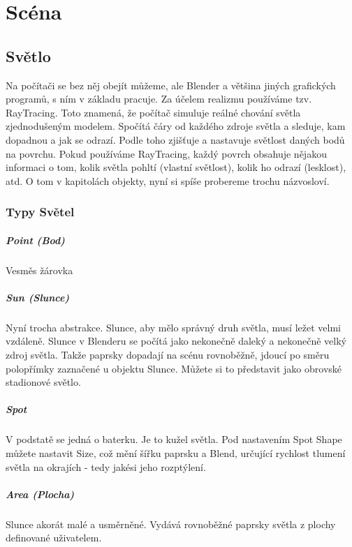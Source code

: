 \documentclass[12pt,a4paper]{report}
\begin{document}
	\chapter{Scéna}
	\section{Světlo}
	Na počítači se bez něj obejít můžeme, ale Blender a většina jiných
	grafických programů, s ním v základu pracuje. Za účelem realizmu
	používáme tzv. RayTracing. Toto znamená, že počítač simuluje reálné
	chování světla zjednodušeným modelem. Spočítá čáry od každého zdroje
	světla a sleduje, kam dopadnou a jak se odrazí. Podle toho zjišťuje
	a nastavuje světlost daných bodů na povrchu. Pokud používáme
	RayTracing, každý povrch obsahuje nějakou informaci o tom, kolik světla
	pohltí (vlastní světlost), kolik ho odrazí (lesklost), atd. O tom v kapitolách
	objekty, nyní si spíše probereme trochu názvosloví.
	
	\subsection{Typy Světel}
	\paragraph{Point (Bod)} Vesměs žárovka
	\paragraph{Sun (Slunce)} Nyní trocha abstrakce. Slunce, aby mělo správný druh
	světla, musí ležet velmi vzdáleně. Slunce v Blenderu se počítá jako
	nekonečně daleký a nekonečně velký zdroj světla. Takže paprsky dopadají
	na scénu rovnoběžně, jdoucí po směru polopřímky zaznačené u objektu
	Slunce. Můžete si to představit jako obrovské stadionové světlo.
	\paragraph{Spot} V podstatě se jedná o baterku. Je to kužel světla. Pod nastavením
	Spot Shape můžete nastavit Size, což mění šířku paprsku a Blend, určující
	rychlost tlumení světla na okrajích - tedy jakési jeho rozptýlení.
	\paragraph{Area (Plocha)} Slunce akorát malé a usměrněné. Vydává rovnoběžné
	paprsky světla z plochy definované uživatelem.
	
\end{document}
